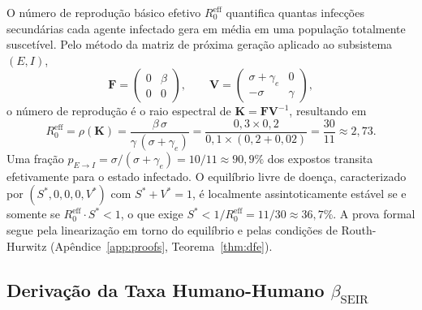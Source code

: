 \documentclass[12pt,a4paper]{article}
\theoremstyle{definition}
\theoremstyle{plain}
\begin{document}
O número de reprodução básico efetivo $R_0^{\text{eff}}$ quantifica quantas infecções secundárias cada agente infectado gera em média em uma população totalmente suscetível. Pelo método da matriz de próxima geração aplicado ao subsistema $(E, I)$,
\begin{equation}
\mathbf{F} = \begin{pmatrix} 0 & \beta \\ 0 & 0 \end{pmatrix}, \qquad
\mathbf{V} = \begin{pmatrix} \sigma + \gamma_e & 0 \\ -\sigma & \gamma \end{pmatrix},
\label{eq:FV}
\end{equation}
o número de reprodução é o raio espectral de $\mathbf{K} = \mathbf{F}\mathbf{V}^{-1}$, resultando em
\begin{equation}
R_0^{\text{eff}} = \rho(\mathbf{K}) = \frac{\beta\, \sigma}{\gamma\,(\sigma + \gamma_e)} = \frac{0{,}3 \times 0{,}2}{0{,}1 \times (0{,}2 + 0{,}02)} = \frac{30}{11} \approx 2{,}73.
\label{eq:R0eff}
\end{equation}
Uma fração $p_{E \to I} = \sigma/(\sigma + \gamma_e) = 10/11 \approx 90{,}9\%$ dos expostos transita efetivamente para o estado infectado. O equilíbrio livre de doença, caracterizado por $(S^*, 0, 0, 0, V^*)$ com $S^* + V^* = 1$, é localmente assintoticamente estável se e somente se $R_0^{\text{eff}} \cdot S^* < 1$, o que exige $S^* < 1/R_0^{\text{eff}} = 11/30 \approx 36{,}7\%$. A prova formal segue pela linearização em torno do equilíbrio e pelas condições de Routh-Hurwitz (Apêndice~\ref{app:proofs}, Teorema~\ref{thm:dfe}).

\subsection{Derivação da Taxa Humano-Humano \texorpdfstring{$\beta_{\text{SEIR}}$}{beta SEIR}}
\label{subsec:betaseir}
\end{document}
